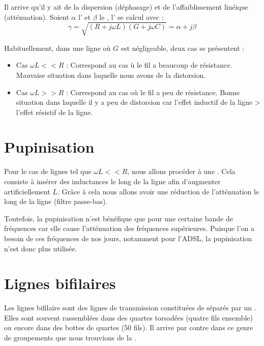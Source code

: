 Il arrive qu'il y ait de la dispersion (déphasage) et de l'affaiblissement linéique (atténuation). Soient $\alpha$ l' et $\beta$ le , l' se calcul avec :
\begin{equation*}
\gamma = \sqrt{(R + j \omega L)(G + j \omega C)} = \alpha + j \beta
\end{equation*}

Habituellement, dans une ligne où $G$ est négligeable, deux cas se présentent :
\begin{itemize}
\item Cas $\omega L << R$ : Correspond au cas ù le fil a beaucoup de résistance. Mauvaise situation dans laquelle nous avons de la distorsion.
\item Cas $\omega L >> R$ : Correspond au cas où le fil a peu de résistance. Bonne situation dans laquelle il y a peu de distorsion car l'effet inductif de la ligne > l'effet résistif de la ligne.
\end{itemize}

\section{Pupinisation}

Pour le cas de lignes tel que $\omega L << R$, nous allons procéder à une .
Cela consiste à insérer des inductances le long de la ligne afin d'augmenter artificiellement $L$.
Grâce à cela nous allons avoir une réduction de l'atténuation le long de la ligne (filtre passe-bas).

Toutefois, la pupinisation n'est bénéfique que pour une certaine bande de fréquences car
elle cause l'atténuation des fréquences supérieures.
Puisque l'on a besoin de ces fréquences de nos jours, notamment pour l’ADSL, la pupinisation n’est donc plus utilisée.

\section{Lignes bifilaires}

Les lignes bifilaire sont des lignes de transmission constituées de  séparés par un . Elles sont souvent rassemblées dans des quartes torsadées (quatre fils ensemble) ou encore dans des bottes de quartes (50 fils). Il arrive par contre dans ce genre de groupements que nous trouvions de la .

